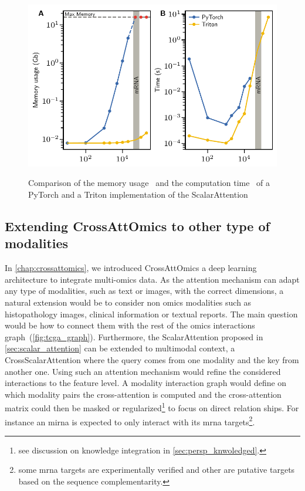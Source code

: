 \documentclass[../main.tex]{subfiles}
\begin{document}
		\begin{figure}[htbp]
			\centering
			\begin{subcaptiongroup}
				\includegraphics{ScalarAttentionBenchmark.pdf}
				\label{fig:lin_attention_benchA}
				\label{fig:lin_attention_benchB}
			\end{subcaptiongroup}
			\caption{Comparison of the memory usage~ and the computation time~ of a \textcolor[HTML]{3969AC}{PyTorch} and a \textcolor[HTML]{F2B701}{Triton} implementation of the ScalarAttention}
			\label{fig:lin_attention_bench}
		\end{figure}

	\subsection{Extending CrossAttOmics to other type of modalities}
		In \cref{chap:crossattomics}, we introduced CrossAttOmics a deep learning architecture to integrate multi-omics data.
		As the attention mechanism can adapt any type of modalities, such as text or images, with the correct dimensions, a natural extension would be to consider non omics modalities such as histopathology images, clinical information or textual reports.
		The main question would be how to connect them with the rest of the omics interactions graph~(\cref{fig:tcga_graph}).
		Furthermore, the ScalarAttention proposed in \cref{sec:scalar_attention} can be extended to multimodal context, \ie{}a CrossScalarAttention where the query comes from one modality and the key from another one.
		Using such an attention mechanism would refine the considered interactions to the feature level.
		A modality interaction graph would define on which modality pairs the cross-attention is computed and the cross-attention matrix could then be masked or regularized\footnote{see discussion on knowledge integration in \cref{sec:persp_knwoledged}.} to focus on direct relation ships.
		For instance an \gls{mirna} is expected to only interact with its \gls{mrna} targets\footnote{some \gls{mrna} targets are experimentally verified and other are putative targets based on the sequence complementarity.}.
\end{document}
